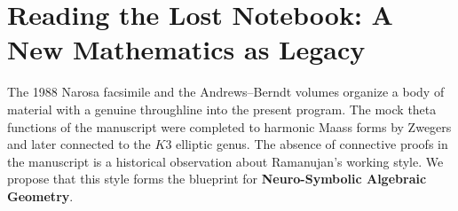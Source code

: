 \section{Reading the Lost Notebook: A New Mathematics as Legacy}
\label{sec:lostnotebook}
The 1988 Narosa facsimile and the Andrews--Berndt volumes organize a body of material with a genuine throughline into the present program. The mock theta functions of the manuscript were completed to harmonic Maass forms by Zwegers and later connected to the $K3$ elliptic genus. The absence of connective proofs in the manuscript is a historical observation about Ramanujan's working style. We propose that this style forms the blueprint for \textbf{Neuro-Symbolic Algebraic Geometry}.
